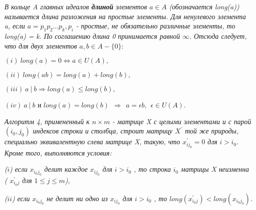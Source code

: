 \begin{determ}
\hspace*{0.5cm}

\textit{В кольце A главных идеалов \textbf{длиной} элементов $a \in A$ (обозначается long(a)) называется длина разложения на простые элементы. Для ненулевого элемента a, если $a = p_1p_2 ... p_k, p_i$ - простые, не обязательно различные элементы, то long(a) = k. По соглашению длина 0 принимается равной $\infty$. Отсюда следует, что для двух элементов $a, b \in A - \{0\}:$}

$(i)~ long(a) = 0 \Longleftrightarrow a \in U(A),$

$(ii)~ long(ab) = long(a) + long(b),$

$(iii)~ a~|~b \Rightarrow long(a) \leqslant long(b), $

$(iv)~ a~|~b$ и $long(a) = long(b) ~~ \Rightarrow ~~ a = \epsilon b, ~~ \epsilon \in U(A). $
\end{determ}
\begin{lemma}
\hspace*{0.5cm}

\textit{ Алгоритм 4, примененный к $n \times m$ - матрице X с целыми элементами и с парой $(i_0, j_0)$ индексов строки и столбца, строит матрицу $X^{'}$ той же природы, специально эквивалентную слева матрице X, такую, что $x^{'}_{ij_0} = 0$ для $i > i_0$. Кроме того, выполняются условия:}

\textit{($i$) если $x_{i_0j_0}$ делит каждое $x_{ij_0}$ для $i > i_0$ , то строка $i_0$ матрицы X неизменна ( $x^{'}_{i_0j}$ для $ 1 \leqslant j \leqslant m $),}

\textit{($ii$) если $x_{i_0j_0}$ не делит ни одно из $x_{ij_0}$ для $i > i_0$ , то $long(x^{'}_{i_0j}) < long(x_{i_0j_0})$.}
\end{lemma}

